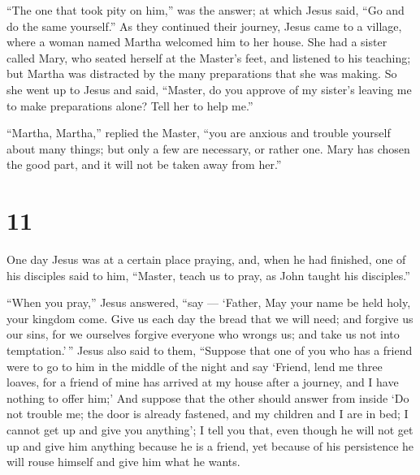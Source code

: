  ``The one that took pity on him,'' was the answer; at
which Jesus said, ``Go and do the same yourself.''  As they
continued their journey, Jesus came to a village, where a woman named
Martha welcomed him to her house.  She had a sister called
Mary, who seated herself at the Master's feet, and listened to his
teaching;  but Martha was distracted by the many
preparations that she was making. So she went up to Jesus and said,
``Master, do you approve of my sister's leaving me to make preparations
alone? Tell her to help me.''

 ``Martha, Martha,'' replied the Master, ``you are anxious
and trouble yourself about many things;  but only a few are
necessary, or rather one. Mary has chosen the good part, and it will not
be taken away from her.''

\hypertarget{section-9}{%
\section{11}\label{section-9}}

 One day Jesus was at a certain place praying, and, when he
had finished, one of his disciples said to him, ``Master, teach us to
pray, as John taught his disciples.''

 ``When you pray,'' Jesus answered, ``say --- `Father, May
your name be held holy, your kingdom come.  Give us each day
the bread that we will need;  and forgive us our sins, for
we ourselves forgive everyone who wrongs us; and take us not into
temptation.'\,''  Jesus also said to them, ``Suppose that
one of you who has a friend were to go to him in the middle of the night
and say `Friend, lend me three loaves,  for a friend of mine
has arrived at my house after a journey, and I have nothing to offer
him;'  And suppose that the other should answer from inside
`Do not trouble me; the door is already fastened, and my children and I
are in bed; I cannot get up and give you anything';  I tell
you that, even though he will not get up and give him anything because
he is a friend, yet because of his persistence he will rouse himself and
give him what he wants.

